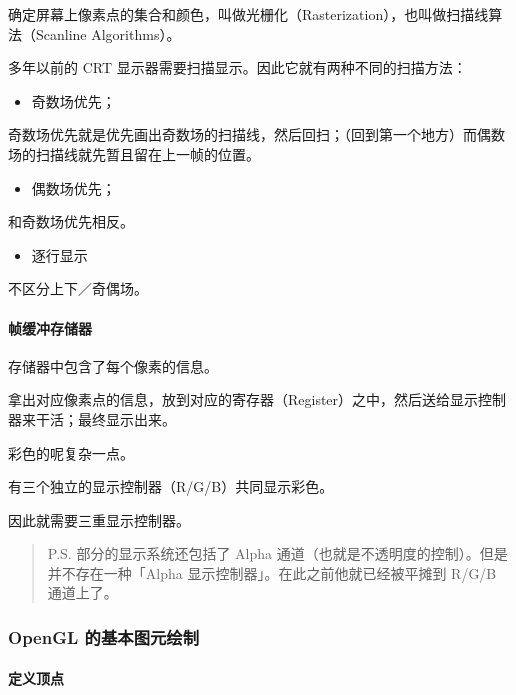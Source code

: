 \documentclass[
]{article}
\begin{document}
确定屏幕上像素点的集合和颜色，叫做光栅化（Rasterization），也叫做扫描线算法（Scanline
Algorithms）。

多年以前的 CRT 显示器需要扫描显示。因此它就有两种不同的扫描方法：

\begin{itemize}
\item
  奇数场优先；
\end{itemize}

奇数场优先就是优先画出奇数场的扫描线，然后回扫；（回到第一个地方）而偶数场的扫描线就先暂且留在上一帧的位置。

\begin{itemize}
\item
  偶数场优先；
\end{itemize}

和奇数场优先相反。

\begin{itemize}
\item
  逐行显示
\end{itemize}

不区分上下／奇偶场。

\hypertarget{header-n149}{%
\paragraph{帧缓冲存储器}\label{header-n149}}

存储器中包含了每个像素的信息。

拿出对应像素点的信息，放到对应的寄存器（Register）之中，然后送给显示控制器来干活；最终显示出来。

彩色的呢复杂一点。

有三个独立的显示控制器（R/G/B）共同显示彩色。

因此就需要三重显示控制器。

\begin{quote}
P.S. 部分的显示系统还包括了 Alpha
通道（也就是不透明度的控制）。但是并不存在一种「Alpha
显示控制器」。在此之前他就已经被平摊到 R/G/B 通道上了。
\end{quote}

\hypertarget{header-n157}{%
\subsubsection{OpenGL 的基本图元绘制}\label{header-n157}}

\hypertarget{header-n158}{%
\paragraph{定义顶点}\label{header-n158}}
\end{document}
